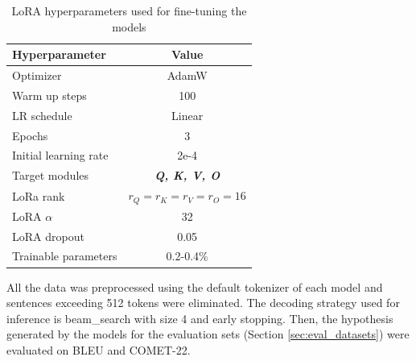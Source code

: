 \documentclass[11pt,english,listoffigures,listoftables]{tfgetsinf}
\begin{document}
\begin{table}[h]
    \centering
    \caption{LoRA hyperparameters used for fine-tuning the models}
    \label{tab:lora_hyper}
    \begin{tabular}{l c}
        \toprule
         Hyperparameter & Value \\
         \midrule
         Optimizer & AdamW \cite{loshchilov2017adam}\\
         Warm up steps & 100 \\
         LR schedule & Linear \\
         \midrule
         Epochs & 3 \\
         Initial learning rate & 2e-4 \\
         Target modules &  \textbf{\textit{Q, K, V, O}} \\
         LoRa rank & $r_Q = r_K = r_V = r_O = 16$ \\
         LoRA $\alpha$ & 32 \\
         LoRA dropout & 0.05 \\
         \midrule
         Trainable parameters & 0.2-0.4\% \\
         \bottomrule
    \end{tabular}
\end{table}

All the data was preprocessed using the default tokenizer of each model and sentences exceeding 512 tokens were eliminated. The decoding strategy used for inference is beam\_search with size 4 and early stopping. Then, the hypothesis generated by the models for the evaluation sets (Section \ref{sec:eval_datasets}) were evaluated on BLEU and COMET-22.



\end{document}
